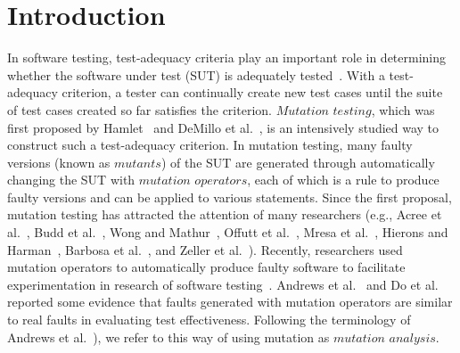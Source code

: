 
\section{Introduction}
\label{Introduction}

In software testing, test-adequacy criteria play an important role
in determining whether the software under test (SUT) is adequately
tested~\cite{Goodenough:75,Zhu:96}. With a test-adequacy
criterion, a tester can continually create new test cases until
the suite of test cases created so far satisfies the criterion.
$Mutation$ $testing$, which was first proposed by
Hamlet~\cite{Hamlet:77} and DeMillo et al.~\cite{DeMillo:78}, is
an intensively studied way to construct such a test-adequacy
criterion. In mutation testing, many faulty versions (known as
$mutants$) of the SUT are generated through automatically changing
the SUT with $mutation$ $operators$, each of which is a rule to
produce faulty versions and can be applied to various statements.
Since the first proposal, mutation testing has attracted the
attention of many researchers (e.g., Acree et al.~\cite{Acree:79},
Budd et al.~\cite{Budd:80b}, Wong and
Mathur~\cite{Mathur:91,Wong:93,Wong:95}, Offutt et
al.~\cite{Offutt:92,Offutt:94,Offutt:96,Offutt:97,Offutt:99,Ma:05},
Mresa et al.~\cite{Mresa:99}, Hierons and
Harman~\cite{Hierons:99}, Barbosa et al.~\cite{Barbosa:01}, and
Zeller et al.~\cite{Grun:09,Schuler:09}). Recently, researchers
used mutation operators to automatically produce faulty software
to facilitate experimentation in research of software
testing~\cite{Briand:04,Briand:06,Mayer:06,Tuya:07}. Andrews et
al.~\cite{Andrews:05} and Do et al.~\cite{Do:06} reported some
evidence that faults generated with mutation operators are similar
to real faults in evaluating test effectiveness. Following the
terminology of Andrews et al.~\cite{Andrews:05,SiamiNamin:08}), we
refer to this way of using mutation as $mutation$ $analysis$.

